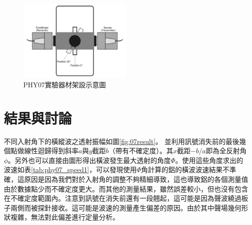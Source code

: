 \documentclass[12pt]{report}
\begin{document}
\begin{figure}[htbp]
    \centering
    \includegraphics[width=0.5\textwidth]{PHY07_app.png}
    \caption{PHY07實驗器材架設示意圖}
    \label{fig:phy07app}
\end{figure}

\section{結果與討論}

不同入射角下的橫縱波之透射振幅如圖\ref{fig:07result}。
並利用訊號消失前的最後幾個點做線性迴歸得到斜率$a$與$y$截距$b$（帶有不確定度）。其$x$截距$-b/a$即為全反射角$\phi$。另外也可以直接由圖形得出橫波發生最大透射的角度$\Phi$。使用這些角度求出的波速如表\ref{tab:phy07_speed1}，可以發現使用$\Phi$角計算的鋁的橫波波速結果不準確，這原因是因為我們對於入射角的調整不夠精細導致，這也導致鋁的各個測量值由於數據點少而不確定度更大。而其他的測量結果，雖然誤差較小，但也沒有包含在不確定度範圍內。注意到訊號在消失前還有一段翹起，這可能是因為聲波繞過板子兩側而被探針接收。這可能是波速的測量產生偏差的原因。由於其中聲場幾何形狀複雜，無法對此偏差進行定量分析。
\end{document}
